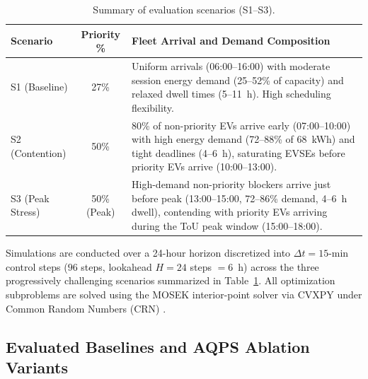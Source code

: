 \documentclass[final,3p,times,twocolumn]{elsarticle}
\begin{document}
\begin{table}[htbp]
\centering
\caption{Summary of evaluation scenarios (S1--S3).}
\label{tab:scenarios}
\footnotesize
\begin{tabular}{p{1.1cm}cp{4.8cm}}
\toprule
Scenario & Priority \% & Fleet Arrival and Demand Composition \\
\midrule
S1 (Baseline) & 27\% & Uniform arrivals (06:00--16:00) with moderate session energy demand (25--52\% of capacity) and relaxed dwell times (5--11~h). High scheduling flexibility. \\
S2 (Contention) & 50\% & 80\% of non-priority EVs arrive early (07:00--10:00) with high energy demand (72--88\% of 68~kWh) and tight deadlines (4--6~h), saturating EVSEs before priority EVs arrive (10:00--13:00). \\
S3 (Peak Stress) & 50\% (Peak) & High-demand non-priority blockers arrive just before peak (13:00--15:00, 72--86\% demand, 4--6~h dwell), contending with priority EVs arriving during the ToU peak window (15:00--18:00). \\
\bottomrule
\end{tabular}
\end{table}

Simulations are conducted over a 24-hour horizon discretized into $\Delta t = 15$-min control steps ($96$ steps, lookahead $H = 24$ steps $= 6$~h) across the three progressively challenging scenarios summarized in Table~\ref{tab:scenarios}. All optimization subproblems are solved using the MOSEK interior-point solver via CVXPY under Common Random Numbers (CRN) \cite{vales2026emergent}.

\subsection{Evaluated Baselines and AQPS Ablation Variants}
\label{sec:baselines}
\end{document}
